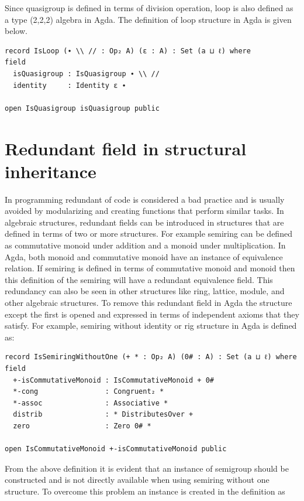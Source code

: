 Since quasigroup is defined in terms of division operation, loop is also defined
as a type (2,2,2) algebra in Agda. The definition of loop structure in Agda is
given below.

\begin{verbatim}
record IsLoop (∙ \\ // : Op₂ A) (ε : A) : Set (a ⊔ ℓ) where
field
  isQuasigroup : IsQuasigroup ∙ \\ //
  identity     : Identity ε ∙

open IsQuasigroup isQuasigroup public
\end{verbatim}

\section{Redundant field in structural inheritance}
In programming redundant of code is considered a bad practice and is usually
avoided by modularizing and creating functions that perform similar tasks. In
algebraic structures, redundant fields can be introduced in structures that are
defined in terms of two or more structures. For example semiring can be defined
as commutative monoid under addition and a monoid under multiplication. In Agda,
both monoid and commutative monoid have an instance of equivalence relation. If
semiring is defined in terms of commutative monoid and monoid then this
definition of the semiring will have a redundant equivalence field. This
redundancy can also be seen in other structures like ring, lattice, module, and
other algebraic structures. To remove this redundant field in Agda the structure
except the first is opened and expressed in terms of independent axioms that
they satisfy. For example, semiring without identity or rig structure in Agda is
defined as:
\begin{verbatim}
record IsSemiringWithoutOne (+ * : Op₂ A) (0# : A) : Set (a ⊔ ℓ) where
field
  +-isCommutativeMonoid : IsCommutativeMonoid + 0#
  *-cong                : Congruent₂ *
  *-assoc               : Associative *
  distrib               : * DistributesOver +
  zero                  : Zero 0# *

open IsCommutativeMonoid +-isCommutativeMonoid public
\end{verbatim}
From the above definition it is evident that an instance of semigroup should be
constructed and is not directly available when using semiring without one
structure. To overcome this problem an instance is created in the definition as
